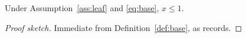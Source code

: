 
\begin{theorem}\label{thm:main}
Under Assumption~\ref{ass:leaf} and \eqref{eq:base}, $x \le 1$.
\end{theorem}

\begin{proof}[Proof sketch]
Immediate from Definition~\ref{def:base}, as \cite[Thm. 2]{beta2021study}
records.
\end{proof}
